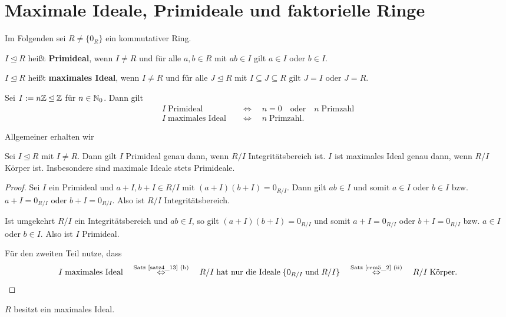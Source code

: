 \section{Maximale Ideale, Primideale und faktorielle Ringe}
Im Folgenden sei $R \neq \{0_R\}$ ein kommutativer Ring.
\begin{definition}
	$I \unlhd R$ heißt \textbf{Primideal}, wenn $I \neq R$ und für alle $a,b \in R$ mit $ab \in I$ gilt $a \in I$ oder $b \in I$.
	
	$I \unlhd R$ heißt \textbf{maximales Ideal}, wenn $I \neq R$ und für alle $J \unlhd R$ mit $I \subseteq J \subseteq R$ gilt $J = I$ oder $J = R$.
\end{definition}
\begin{beispiel}\label{beispiel6_2}
	Sei $I := n\mathbb{Z} \unlhd \mathbb{Z}$ für $n \in \mathbb{N}_0$. Dann gilt
	\begin{align*}
		I \;\text{Primideal} \quad&\Leftrightarrow\quad n = 0 \quad\text{oder}\quad n \;\text{Primzahl}\\
		I \;\text{maximales Ideal} \quad&\Leftrightarrow\quad n \;\text{Primzahl}.
	\end{align*}
\end{beispiel}
Allgemeiner erhalten wir
\begin{prop}\label{prop6_3}
	Sei $I \unlhd R$ mit $I \neq R$. Dann gilt $I$ Primideal genau dann, wenn $R/I$ Integritätsbereich ist. $I$ ist maximales Ideal genau dann, wenn $R/I$ Körper ist. Insbesondere sind maximale Ideale stets Primideale.
\end{prop}
\begin{proof}
	Sei $I$ ein Primideal und $a + I, b + I \in R/I$ mit $(a+I)(b+I) = 0_{R/I}$. Dann gilt $ab \in I$ und somit $a \in I$ oder $b \in I$ bzw. $a + I = 0_{R/I}$ oder $b + I = 0_{R/I}$. Also ist $R/I$ Integritätsbereich.
	
	Ist umgekehrt $R/I$ ein Integritätsbereich und $ab \in I$, so gilt $(a+I)(b+I) = 0_{R/I}$ und somit $a + I = 0_{R/I}$ oder $b+I = 0_{R/I}$ bzw. $a \in I$ oder $b \in I$. Also ist $I$ Primideal.
	
	Für den zweiten Teil nutze, dass
	\[I\;\text{maximales Ideal} \quad\overset{\text{Satz \ref{satz4_13} (b)}}{\Leftrightarrow}\quad R/I \; \text{hat nur die Ideale}\;\{0_{R/I}\;\text{und}\;R/I\} \quad\overset{\text{Satz \ref{rem5_2} (ii)}}{\Leftrightarrow}\quad R/I \;\text{Körper}.\]
\end{proof}
\begin{satz}\label{satz6_4}
	$R$ besitzt ein maximales Ideal.
\end{satz}
